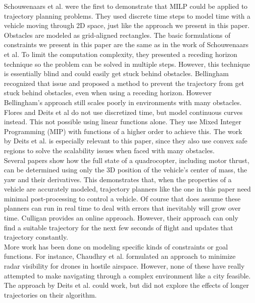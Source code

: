 Schouwenaars et al. \cite{Schouwenaars2001} were the first to demonstrate that MILP could be applied to trajectory planning problems. They used discrete time steps to model time with a vehicle moving through 2D space, just like the approach we present in this paper. Obstacles are modeled as grid-aligned rectangles. The basic formulations of constraints we present in this paper are the same as in the work of Schouwenaars et al. To limit the computation complexity, they presented a receding horizon technique so the problem can be solved in multiple steps. However, this technique is essentially blind and could easily get stuck behind obstacles. Bellingham\cite{Bellingham2002} recognized that issue and proposed a method to prevent the trajectory from get stuck behind obstacles, even when using a receding horizon. However Bellingham's approach still scales poorly in environments with many obstacles.\\
Flores\cite{Flores2007} and Deits et al\cite{Deits2015} do not use discretized time, but model continuous curves instead. This not possible using linear functions alone. They use Mixed Integer Programming (MIP) with functions of a higher order to achieve this. The work by Deits et al. is especially relevant to this paper, since they also use convex safe regions to solve the scalability issues when faced with many obstacles. \\
Several papers \cite{Fliess1995a, Hao2005, Cowling2007, Mellinger2011} show how the full state of a quadrocopter, including motor thrust, can be determined using only the 3D position of the vehicle's center of mass, the yaw and their derivatives. This demonstrates that, when the properties of a vehicle are accurately modeled, trajectory planners like the one in this paper need minimal post-processing to control a vehicle. Of course that does assume these planners can run in real time to deal with errors that inevitably will grow over time. Culligan \cite{Culligan2006} provides an online approach. However, their approach can only find a suitable trajectory for the next few seconds of flight and updates that trajectory constantly. \\
More work has been done on modeling specific kinds of constraints or goal functions. For instance, Chaudhry et al. \cite{Chaudhry2004} formulated an approach to minimize radar visibility for drones in hostile airspace. However, none of these have really attempted to make navigating through a complex environment like a city feasible. The approach by Deits et al. \cite{Deits2015} could work, but did not explore the effects of longer trajectories on their algorithm.